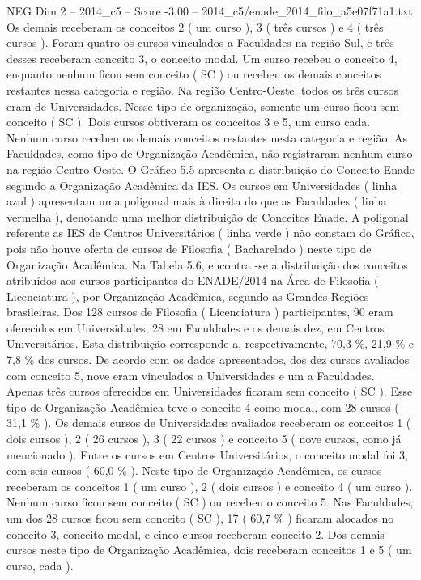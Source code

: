 \begin{textsample}{NEG Dim 2 – 2014\_c5 – Score -3.00 – 2014\_c5/enade\_2014\_filo\_a5e07f71a1.txt}
Os demais receberam os conceitos 2 ( um curso ), 3 ( três cursos ) e 4 ( três cursos ).
Foram quatro os cursos vinculados a Faculdades na região Sul, e três desses receberam conceito 3, o conceito modal.
Um curso recebeu o conceito 4, enquanto nenhum ficou sem conceito ( SC ) ou recebeu os demais conceitos restantes nessa categoria e região.
Na região Centro-Oeste, todos os três cursos eram de Universidades.
Nesse tipo de organização, somente um curso ficou sem conceito ( SC ).
Dois cursos obtiveram os conceitos 3 e 5, um curso cada.
Nenhum curso recebeu os demais conceitos restantes nesta categoria e região.
As Faculdades, como tipo de Organização Acadêmica, não registraram nenhum curso na região Centro-Oeste.
O Gráfico 5.5 apresenta a distribuição do Conceito Enade segundo a Organização Acadêmica da IES.
Os cursos em Universidades ( linha azul ) apresentam uma poligonal mais à direita do que as Faculdades ( linha vermelha ), denotando uma melhor distribuição de Conceitos Enade.
A poligonal referente as IES de Centros Universitários ( linha verde ) não constam do Gráfico, pois não houve oferta de cursos de Filosofia ( Bacharelado ) neste tipo de Organização Acadêmica.
Na Tabela 5.6, encontra -se a distribuição dos conceitos atribuídos aos cursos participantes do ENADE/2014 na Área de Filosofia ( Licenciatura ), por Organização Acadêmica, segundo as Grandes Regiões brasileiras.
Dos 128 cursos de Filosofia ( Licenciatura ) participantes, 90 eram oferecidos em Universidades, 28 em Faculdades e os demais dez, em Centros Universitários.
Esta distribuição corresponde a, respectivamente, 70,3 \%, 21,9 \% e 7,8 \% dos cursos.
De acordo com os dados apresentados, dos dez cursos avaliados com conceito 5, nove eram vinculados a Universidades e um a Faculdades.
Apenas três cursos oferecidos em Universidades ficaram sem conceito ( SC ).
Esse tipo de Organização Acadêmica teve o conceito 4 como modal, com 28 cursos ( 31,1 \% ).
Os demais cursos de Universidades avaliados receberam os conceitos 1 ( dois cursos ), 2 ( 26 cursos ), 3 ( 22 cursos ) e conceito 5 ( nove cursos, como já mencionado ).
Entre os cursos em Centros Universitários, o conceito modal foi 3, com seis cursos ( 60,0 \% ).
Neste tipo de Organização Acadêmica, os cursos receberam os conceitos 1 ( um curso ), 2 ( dois cursos ) e conceito 4 ( um curso ).
Nenhum curso ficou sem conceito ( SC ) ou recebeu o conceito 5.
Nas Faculdades, um dos 28 cursos ficou sem conceito ( SC ), 17 ( 60,7 \% ) ficaram alocados no conceito 3, conceito modal, e cinco cursos receberam conceito 2.
Dos demais cursos neste tipo de Organização Acadêmica, dois receberam conceitos 1 e 5 ( um curso, cada ).

\end{textsample}

